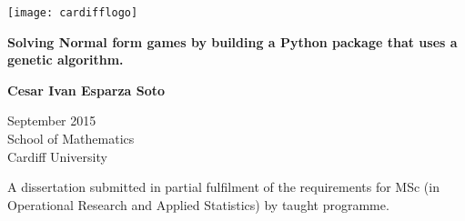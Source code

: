 \begin{titlepage}
	\begin{center}
	\vspace*{1cm}
	\thispagestyle{empty}

	\texttt{[image: cardifflogo]}

	\vspace{1.5cm}

	\Huge
	\textbf{Solving Normal form games by building a Python package that uses a genetic algorithm.}

	\vspace{1cm}

	\Large
	\textbf{Cesar Ivan Esparza Soto}
	
	\vspace{1.5cm}	

	\Large
	September 2015\\

	School of Mathematics\\

	Cardiff University\\

	\vfill	
	
	\normalsize
	A  dissertation submitted in partial fulfilment of the requirements for MSc (in Operational Research and Applied Statistics) by 			taught programme.
	\end{center}
\end{titlepage}